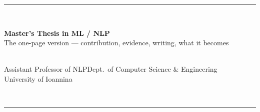 \documentclass[10pt,a4paper]{article}
\begin{document}
\fontsize{6.75}{7.9}\selectfont

{\color{brandlight}\rule{\textwidth}{2pt}}\\[2pt]
\begin{minipage}[b]{0.63\textwidth}
{\fontsize{17}{18}\selectfont\bfseries\color{brand} Master's Thesis in ML / NLP}\\[2pt]
{\fontsize{8}{9}\selectfont\color{ink} The one-page version --- contribution, evidence, writing, what it becomes}
\end{minipage}%
\hfill
\begin{minipage}[b]{0.36\textwidth}\raggedleft
{\fontsize{8}{9}\selectfont\bfseries\color{ink} \guideauthor}\\[1pt]
{\color{mutegray} Assistant Professor of NLP\dt Dept.\ of Computer Science \& Engineering\\
University of Ioannina\dt {}}
\end{minipage}\\[2pt]
{\color{brandlight}\rule{\textwidth}{2pt}}
\end{document}
